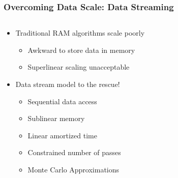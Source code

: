 \documentclass{beamer}
\begin{document}
\begin{frame}
\begin{columns}
\end{columns}
\end{frame}


\begin{frame}
\frametitle{Overcoming Data Scale: Data Streaming}


\begin{columns}
\begin{column}{0.55\textwidth}
	\begin{itemize}
		\item Traditional RAM algorithms scale poorly
		\begin{itemize}
			\item Awkward to store data in memory
			\item Superlinear scaling unacceptable
		\end{itemize}
		\item Data stream model to the rescue!
		\begin{itemize}
			\item Sequential data access
			\item Sublinear memory
			\item Linear amortized time
			\item Constrained number of passes
			\item Monte Carlo Approximations
		\end{itemize}
	\end{itemize}
\end{column}
\begin{column}{0.45\textwidth}  %
\begin{center}

\end{center}
\end{column}
\end{columns}
\end{frame}
\end{document}
